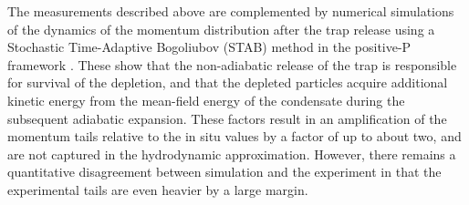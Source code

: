 	The measurements described above are complemented by numerical simulations of the dynamics of the momentum distribution after the trap release using a Stochastic Time-Adaptive Bogoliubov (STAB) method in the positive-P framework  \cite{Deuar11,Kheruntsyan12}. 
	These show that the non-adiabatic release of the trap is responsible for survival of the depletion, and that the depleted particles acquire additional kinetic energy from the mean-field energy of the condensate during the subsequent adiabatic expansion. 
	These factors result in an amplification of the momentum tails relative to the in situ values {by a factor of up to about two}, and are not captured in the hydrodynamic approximation. 
	However, there remains a quantitative disagreement between simulation and the experiment {in that the experimental tails are even heavier by a large margin.}

